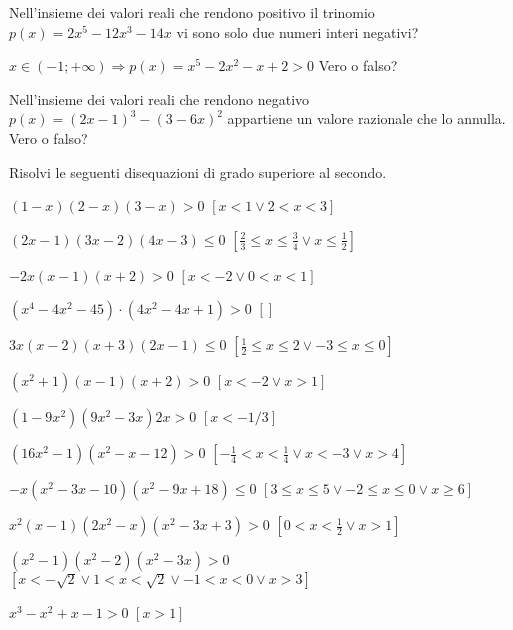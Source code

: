 \begin{esercizio}
\label{ese:4.35}
Nell'insieme dei valori reali che rendono positivo il trinomio 
$p(x)=2x^5-12x^3-14x$ vi sono solo due numeri interi negativi?
\end{esercizio}

\begin{esercizio}
 \label{ese:4.36}
$x\in (-1;+\infty )\Rightarrow p(x)=x^5-2x^2-x+2>0$ Vero o falso?
\end{esercizio}

\begin{esercizio}
\label{ese:4.37}
Nell'insieme dei valori reali che rendono negativo $p(x)=(2x-1)^3-(3-6x)^2$ 
appartiene un valore razionale che lo annulla. Vero o falso?
\end{esercizio}

\begin{esercizio}[\Ast]
\label{ese:4.38}
Risolvi le seguenti disequazioni di grado superiore al secondo.
\begin{enumeratea}
\item $(1-x)(2-x)(3-x)>0$ \hfill $\left[x<1\vee 2<x<3\right]$
\item $(2x-1)(3x-2)(4x-3)\le 0$ 
 \hfill $\left[\frac 2 3\le x\le \frac 3 4 \vee x\le \frac 1 2\right]$
\item $-2x(x-1)(x+2)>0$ \hfill $\left[x<-2\vee 0<x<1\right]$
\item $ \left(x^4-4x^2-45\right)\cdot \left(4x^2-4x+1\right)>0 $ 
 \hfill $\left[\right]$
\item $3x(x-2)(x+3)(2x-1)\le 0$ 
 \hfill $\left[\frac 1 2\le x\le 2\vee -3\le x\le 0\right]$
\item $\left(x^2+1\right)(x-1)(x+2)>0$ \hfill $\left[x<-2\vee x>1\right]$
\item $\left(1-9x^2\right)\left(9x^2-3x\right)2x>0$ 
 \hfill $\left[x<-1/3\right]$
\item $\left(16x^2-1\right)\left(x^2-x-12\right)>0$ 
 \hfill $\left[-\frac 1 4<x<\frac 1 4\vee x<-3\vee x>4\right]$
\item $-x\left(x^2-3x-10\right)\left(x^2-9x+18\right)\le 0$
 \hfill $\left[3\le x\le 5\vee -2\le x\le 0\vee x\ge 6\right]$
\item $x^2(x-1)\left(2x^2-x\right)\left(x^2-3x+3\right)>0$
 \hfill $\left[0<x<\frac 1 2\vee x>1\right]$
\item $\left(x^2-1\right)\left(x^2-2\right)\left(x^2-3x\right)>0$
 \hfill $\left[x<-\sqrt 2\vee 1<x<\sqrt 2\vee -1<x<0\vee x>3\right]$
\item $x^3-x^2+x-1>0$ \hfill $\left[x>1\right]$

\end{enumeratea}
\end{esercizio}
